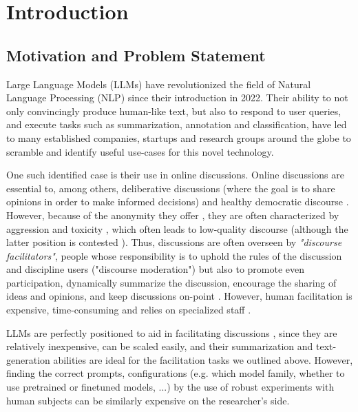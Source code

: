 %
\chapter{Introduction}
\label{sec:intro}

\section{Motivation and Problem Statement}
\label{sec:intro:motivation}

Large Language Models (LLMs) have revolutionized the field of Natural Language Processing (NLP) since their introduction in 2022. Their ability to not only convincingly produce human-like text, but also to respond to user queries, and execute tasks such as summarization, annotation and classification, have led to many established companies, startups and research groups around the globe to scramble and identify useful use-cases for this novel technology.

One such identified case is their use in online discussions. Online discussions are essential to, among others, deliberative discussions \cite{small2021polis} (where the goal is to share opinions in order to make informed decisions) and healthy democratic discourse \cite{WrightDemocracy, Janssen2005, Papacharissi2004DemocracyOC}. However, because of the anonymity they offer \cite{Avalle2024PersistentIP}, they are often characterized by aggression and toxicity \cite{XiaToxicity}, which often leads to low-quality discourse \cite{WrightDemocracy} (although the latter position is contested \cite{Papacharissi2004DemocracyOC}). Thus, discussions are often overseen by \textit{"discourse facilitators"}, people whose responsibility is to uphold the rules of the discussion and discipline users ("discourse moderation") but also to promote even participation, dynamically summarize the discussion, encourage the sharing of ideas and opinions, and keep discussions on-point \cite{Harvard2024, Wang2008StudentfacilitatorsRI}. However, human facilitation is expensive, time-consuming and relies on specialized staff \cite{small-polis-llm}.

LLMs are perfectly positioned to aid in facilitating discussions \cite{small-polis-llm}, since they are relatively inexpensive, can be scaled easily, and their summarization and text-generation abilities are ideal for the facilitation tasks we outlined above. However, finding the correct prompts, configurations (e.g. which model family, whether to use pretrained or finetuned models, ...) by the use of robust experiments with human subjects can be similarly expensive on the researcher's side.

